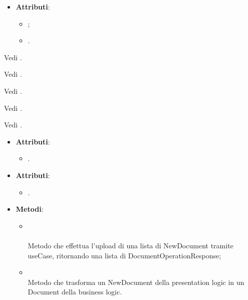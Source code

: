 \documentclass[10pt, a4paper]{article}
\begin{document}
\label{PlainDocumentDettaglio}
\begin{itemize}
    \item \textbf{Attributi}:
    \begin{itemize}
        \item {};
        \item {}.
    \end{itemize}
\end{itemize}

Vedi .

Vedi .

Vedi .

Vedi .

Vedi .

\label{DocumentContentDettaglio}
\begin{itemize}
    \item \textbf{Attributi}:
    \begin{itemize}
        \item {}.
    \end{itemize}
\end{itemize}

\label{UploadDocumentsControllerDettaglio}
\begin{itemize}
    \item \textbf{Attributi}:
    \begin{itemize}
        \item {}.
    \end{itemize}
    \item \textbf{Metodi}:
    \begin{itemize}
        \item {}\\ \\
        Metodo che effettua l'upload di una lista di NewDocument tramite useCase, ritornando una lista di DocumentOperationResponse;
        \item {}\\
        Metodo che trasforma un NewDocument della presentation logic in un Document della business logic.
    \end{itemize}
\end{itemize}
\end{document}
